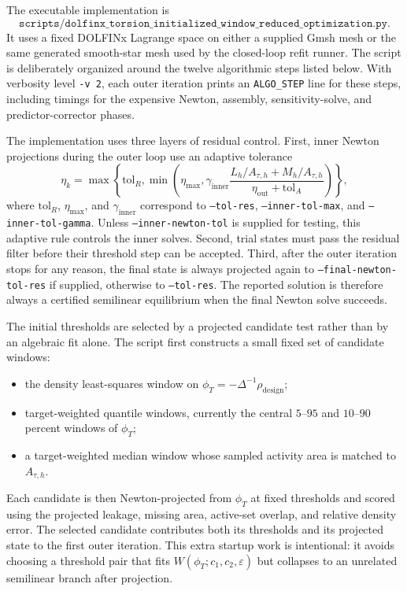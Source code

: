 \documentclass[11pt]{article}
\begin{document}
The executable implementation is
\[
\texttt{scripts/dolfinx\_torsion\_initialized\_window\_reduced\_optimization.py}.
\]
It uses a fixed DOLFINx Lagrange space on either a supplied Gmsh mesh or the
same generated smooth-star mesh used by the closed-loop refit runner.  The
script is deliberately organized around the twelve algorithmic steps listed
below.  With verbosity level \texttt{-v 2}, each outer iteration prints an
\texttt{ALGO\_STEP} line for these steps, including timings for the expensive
Newton, assembly, sensitivity-solve, and predictor-corrector phases.

The implementation uses three layers of residual control.
First, inner Newton projections during the outer loop use an adaptive tolerance
\[
\eta_k
=
\max\left\{
\mathrm{tol}_R,
\min\left(
\eta_{\max},
\gamma_{\mathrm{inner}}
\frac{L_h/A_{\tau,h}+M_h/A_{\tau,h}}
{\eta_{\mathrm{out}}+\mathrm{tol}_A}
\right)
\right\},
\]
where $\mathrm{tol}_R$, $\eta_{\max}$, and $\gamma_{\mathrm{inner}}$ correspond
to \texttt{--tol-res}, \texttt{--inner-tol-max}, and
\texttt{--inner-tol-gamma}.  Unless \texttt{--inner-newton-tol} is supplied for testing, this adaptive
rule controls the inner solves.  Second, trial
states must pass the residual filter before their threshold step can be
accepted.  Third, after the outer iteration stops for any reason, the final
state is always projected again to \texttt{--final-newton-tol-res} if supplied,
otherwise to \texttt{--tol-res}.  The reported solution is therefore always a
certified semilinear equilibrium when the final Newton solve succeeds.

The initial thresholds are selected by a projected candidate test rather than
by an algebraic fit alone.  The script first constructs a small fixed set of
candidate windows:
\begin{itemize}[leftmargin=2em]
\item the density least-squares window on $\phi_T=-\Delta^{-1}\rho_{\mathrm{design}}$;
\item target-weighted quantile windows, currently the central $5$--$95$ and
$10$--$90$ percent windows of $\phi_T$;
\item a target-weighted median window whose sampled activity area is matched
to $A_{\tau,h}$.
\end{itemize}
Each candidate is then Newton-projected from $\phi_T$ at fixed thresholds and
scored using the projected leakage, missing area, active-set overlap, and
relative density error.  The selected candidate contributes both its thresholds
and its projected state to the first outer iteration.  This extra startup work
is intentional: it avoids choosing a threshold pair that fits
$W(\phi_T;c_1,c_2,\varepsilon)$ but collapses to an unrelated semilinear branch
after projection.
\end{document}
